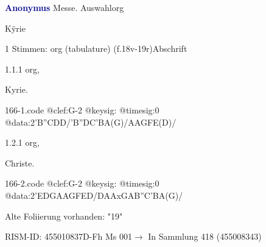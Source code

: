\documentclass[twocolumn, 12pt]{book}
\begin{document}
\par \vspace{16pt} \textcolor{darkblue}{\textbf{Anonymus  }}\hfillplus{\textbf{[166]}}\newline Messe. Auswahl\newline org
\par \begin{itshape}[f.18v, at left:] Kÿrie\end{itshape} 
\par \textcolor{darkblue}{}  1 Stimmen: org (tabulature)  (f.18v-19r)\newline Abschrift
\par 1.1.1  org, \begin{itshape}Kyrie.\end{itshape}  
\begin{filecontents*}{166-1.code}
@clef:G-2
@keysig:
@timesig:0
@data:2'B''CDD/'B''DC'BA(G)/AAGFE(D)/
\end{filecontents*}
\newline %
\par 1.2.1  org, \begin{itshape}Christe.\end{itshape}  
\begin{filecontents*}{166-2.code}
@clef:G-2
@keysig:
@timesig:0
@data:2'EDGAAGFED/DAAxGAB''C'BA(G)/
\end{filecontents*}
\newline %
\par Alte Foliierung vorhanden: "19"
\par RISM-ID: 455010837\newline D-Fh  Ms 001\newline $\rightarrow$ In Sammlung 418 (455008343)
      
\end{document}
